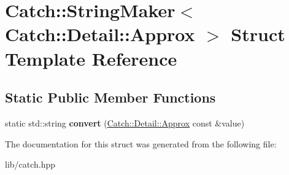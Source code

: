 \hypertarget{struct_catch_1_1_string_maker_3_01_catch_1_1_detail_1_1_approx_01_4}{}\section{Catch\+:\+:String\+Maker$<$ Catch\+:\+:Detail\+:\+:Approx $>$ Struct Template Reference}
\label{struct_catch_1_1_string_maker_3_01_catch_1_1_detail_1_1_approx_01_4}
\subsection*{Static Public Member Functions}
\begin{DoxyCompactItemize}
\item 
\mbox{\label{struct_catch_1_1_string_maker_3_01_catch_1_1_detail_1_1_approx_01_4_a8e5015720682fecfbff0f05de19a698f}} 
static std\+::string {\bfseries convert} (\mbox{\hyperlink{class_catch_1_1_detail_1_1_approx}{Catch\+::\+Detail\+::\+Approx}} const \&value)
\end{DoxyCompactItemize}


The documentation for this struct was generated from the following file\+:\begin{DoxyCompactItemize}
\item 
lib/catch.\+hpp\end{DoxyCompactItemize}
